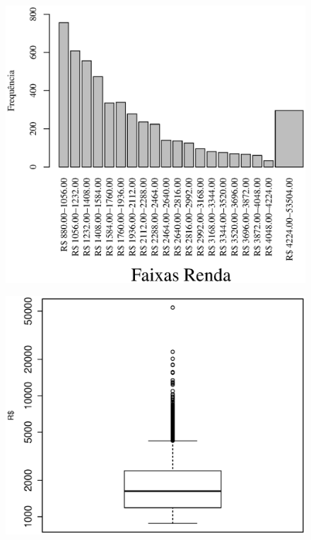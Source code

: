 \documentclass[10pt,a4paper,oneside]{article}
\begin{document}
\begin{figure}[h]
\centering
\begin{minipage}{0.49\textwidth}
	\centering
		\includegraphics[width=\linewidth]{plots/histogram_renda.eps}
	\label{figure:histograma-boxplot-renda}
\end{minipage}
%
\begin{minipage}{0.49\textwidth}
	\centering
		\includegraphics[width=\linewidth]{plots/boxplot_renda_log.eps}
	\label{figure:histograma-boxplot-renda}
\end{minipage}
\end{figure}
\end{document}
